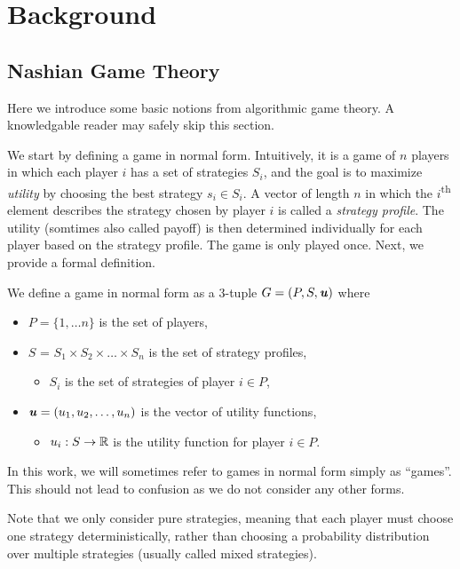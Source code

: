 \chapter{Background}
\label{chap:background}

\section{Nashian Game Theory}
Here we introduce some basic notions from algorithmic game theory.
A knowledgable reader may safely skip this section.

We start by defining a game in normal form.
Intuitively, it is a game of $n$ players in which each player $i$ has a set of strategies $S_i$, and the goal is to maximize \textit{utility} by choosing the best strategy $s_i \in S_i$.
A vector of length $n$ in which the $i$\textsuperscript{th} element describes the strategy chosen by player $i$ is called a \textit{strategy profile}.
The utility (somtimes also called payoff) is then determined individually for each player based on the strategy profile.
The game is only played once.
Next, we provide a formal definition.

\begin{definition}
  We define a game in normal form as a 3-tuple $G = (P, S, \boldsymbol{\mathit{u}})$ where
  \begin{itemize}
    \item $P = \{1, \dots n\}$ is the set of players,
    \item $S$ = $S_1 \times S_2 \times \dots \times S_n$ is the set of strategy profiles,
    \begin{itemize}
      \item $S_i$ is the set of strategies of player $i \in P$,
    \end{itemize}
    \item $\boldsymbol{\mathit{u}} = (u_1, u_2, \dots, u_n)$ is the vector of utility functions,
    \begin{itemize}
      \item $u_i: S \rightarrow \mathbb{R}$ is the utility function for player $i \in P$.
    \end{itemize}
  \end{itemize}
  In this work, we will sometimes refer to games in normal form simply as \enquote{games}.
  This should not lead to confusion as we do not consider any other forms.
\end{definition}

Note that we only consider pure strategies, meaning that each player must choose one strategy deterministically, rather than choosing a probability distribution over multiple strategies (usually called mixed strategies).

